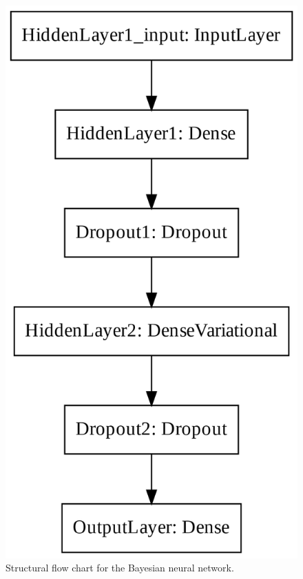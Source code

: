 \begin{figure}[!htp]
\centering
\begin{minipage}[b][][b]{.35\linewidth}
    \includegraphics[width=\linewidth]{templates/images/Figure-TF_BNN_Structure.png}
    \caption[Bayesian neural network structural flow]{Structural flow chart for the Bayesian neural network.}
    \label{fig:bnn_text_structure}

\end{minipage}
\end{figure}
